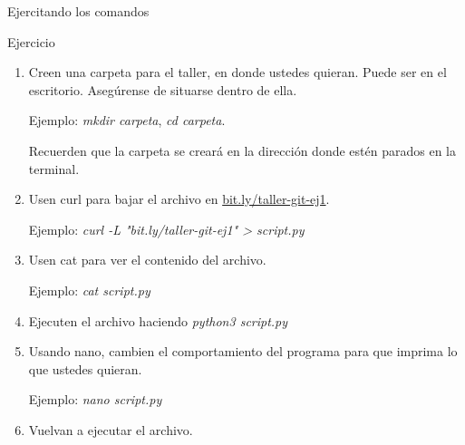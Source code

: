 \begin{frame}{Ejercitando los comandos}

\begin{ejercicio}{Ejercicio}
    \begin{enumerate}
        \item Creen una carpeta para el taller, en donde ustedes quieran. Puede ser en el escritorio. Asegúrense de situarse dentro de ella.
        
        Ejemplo: \textit{mkdir carpeta},      
        \textit{cd carpeta}.
        
        Recuerden que la carpeta se creará en la dirección donde estén parados en la terminal. 
        \pause
        \item Usen curl para bajar el archivo en \href{https://bit.ly/taller-git-ej1}{bit.ly/taller-git-ej1}. 
        
        Ejemplo: \textit{curl -L "bit.ly/taller-git-ej1" > script.py}
        \pause
        \item Usen cat para ver el contenido del archivo. 
        
        Ejemplo: \textit{cat script.py}
        \pause
        \item Ejecuten el archivo haciendo \textit{python3 script.py}
        \pause
        \item Usando nano, cambien el comportamiento del programa para que imprima lo que ustedes quieran. 
        
        Ejemplo: \textit{nano script.py}
        \pause
        \item Vuelvan a ejecutar el archivo.
    \end{enumerate}
\end{ejercicio}
\end{frame}
